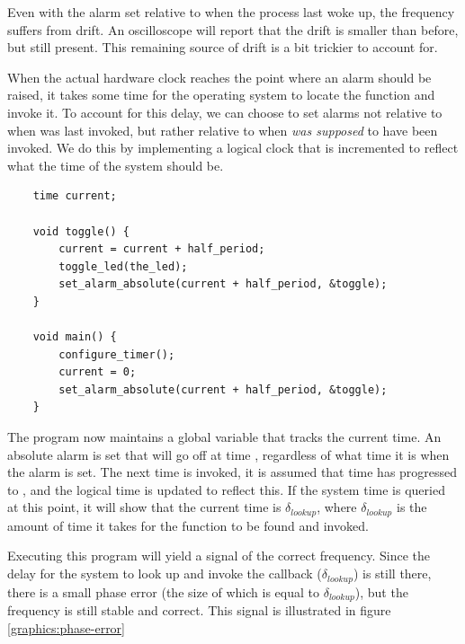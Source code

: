 Even with the alarm set relative to when the process last woke up, the frequency suffers from drift. An oscilloscope
will report that the drift is smaller than before, but still present. This remaining source of drift is a bit
trickier to account for.

When the actual hardware clock reaches the point where an alarm should be raised, it takes some time for the
operating system to locate the  function and invoke it. To account for this delay, we can choose to
set alarms not relative to when  was last invoked, but rather relative to when 
\textit{was supposed} to have been invoked. We do this by implementing a logical clock that is incremented to reflect
what the time of the system should be.

\begin{verbatim}
    time current;

    void toggle() {
        current = current + half_period;
        toggle_led(the_led);
        set_alarm_absolute(current + half_period, &toggle);
    }

    void main() {
        configure_timer();
        current = 0;
        set_alarm_absolute(current + half_period, &toggle);
    }
\end{verbatim}

The program now maintains a global variable that tracks the current time. An absolute alarm is set that will go off at
time , regardless of what time it is when the alarm is set. The next time 
is invoked, it is assumed that time has progressed to , and the logical time is updated
to reflect this. If the system time is queried at this point, it will show that the current time is 
 $\delta_{lookup}$, where $\delta_{lookup}$ is the amount of time it takes for the
 function to be found and invoked.

Executing this program will yield a signal of the correct frequency. Since the delay for the system to look up and
invoke the callback ($\delta_{lookup}$) is still there, there is a small phase error (the size of which is equal to
$\delta_{lookup}$), but the frequency is still stable and correct. This signal is illustrated in figure \ref{graphics:phase-error}


